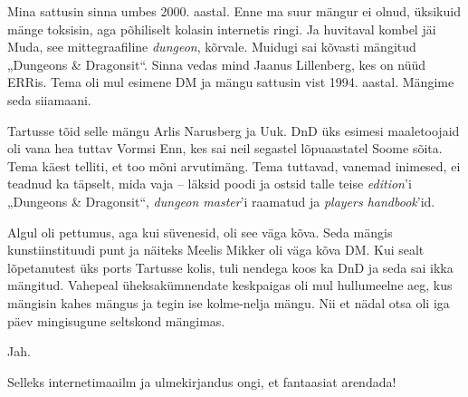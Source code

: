 Mina sattusin sinna umbes 2000. aastal. Enne ma suur mängur ei olnud, 
üksikuid mänge toksisin, aga põhiliselt kolasin internetis ringi. Ja huvitaval kombel jäi Muda, see 
mittegraafiline \emph{dungeon}, kõrvale. Muidugi sai kõvasti mängitud 
„Dungeons \& Dragonsit“. Sinna vedas mind Jaanus 
Lillenberg, kes on nüüd ERRis. Tema oli mul 
esimene DM ja mängu sattusin 
vist 1994. aastal. Mängime seda siiamaani.


Tartusse tõid selle mängu Arlis 
Narusberg ja Uuk. DnD üks esimesi maaletoojaid oli vana 
hea tuttav Vormsi Enn, kes sai neil segastel lõpuaastatel Soome sõita. 
Tema käest telliti, et too mõni arvutimäng. Tema tuttavad, vanemad 
inimesed, ei teadnud ka täpselt, mida vaja -- läksid poodi ja ostsid talle teise 
\emph{edition}'i „Dungeons \& Dragonsit“, \emph{dungeon master}'i raamatud ja 
\emph{players handbook}'id. 

Algul oli pettumus, aga kui süvenesid, oli see väga kõva. Seda mängis 
kunstiinstituudi punt ja näiteks Meelis Mikker oli väga kõva DM. 
Kui sealt lõpetanutest üks ports Tartusse kolis, tuli nendega koos ka DnD ja 
seda sai ikka mängitud. Vahepeal üheksakümnendate keskpaigas oli mul 
hullumeelne aeg, kus mängisin kahes mängus ja tegin ise kolme-nelja 
mängu. Nii et nädal otsa oli iga päev mingisugune seltskond mängimas.


Jah.


Selleks internetimaailm ja ulmekirjandus ongi, et fantaasiat arendada!

